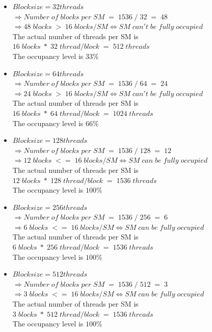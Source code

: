 \begin{itemize}
  \item $Block size = 32 threads$ \\ $\Rightarrow Number \; of \; blocks \; per \; SM \; = \; 1536 \; / \; 32 \; = \; 48$ \\ $\Rightarrow 48\;blocks\; > \; 16\;blocks/SM \Leftrightarrow SM \; can't \; be \; fully \; occupied$ \\ The actual number of threads per SM is $16\;blocks\;*\;32\;thread/block\;=\;512\;threads$ \\The occupancy level is $33\%$
  \item $Block size = 64 threads$ \\ $\Rightarrow Number \; of \; blocks \; per \; SM \; = \; 1536 \; / \; 64 \; = \; 24$ \\ $\Rightarrow 24\;blocks\; > \; 16\;blocks/SM \Leftrightarrow SM \; can't \; be \; fully \; occupied$ \\ The actual number of threads per SM is $16\;blocks\;*\;64\;thread/block\;=\;1024\;threads$ \\The occupancy level is $66\%$
  \item $Block size = 128 threads$ \\ $\Rightarrow Number \; of \; blocks \; per \; SM \; = \; 1536 \; / \; 128 \; = \; 12$ \\ $\Rightarrow 12\;blocks\; <= \; 16\;blocks/SM \Leftrightarrow SM \; can \; be \; fully \; occupied$ \\ The actual number of threads per SM is $12\;blocks\;*\;128\;thread/block\;=\;1536\;threads$ \\The occupancy level is $100\%$
  \item $Block size = 256 threads$ \\ $\Rightarrow Number \; of \; blocks \; per \; SM \; = \; 1536 \; / \; 256 \; = \; 6$ \\ $\Rightarrow 6\;blocks\; <= \; 16\;blocks/SM \Leftrightarrow SM \; can \; be \; fully \; occupied$ \\ The actual number of threads per SM is $6\;blocks\;*\;256\;thread/block\;=\;1536\;threads$ \\The occupancy level is $100\%$
  \item $Block size = 512 threads$ \\ $\Rightarrow Number \; of \; blocks \; per \; SM \; = \; 1536 \; / \; 512 \; = \; 3$ \\ $\Rightarrow 3\;blocks\; <= \; 16\;blocks/SM \Leftrightarrow SM \; can \; be \; fully \; occupied$ \\ The actual number of threads per SM is $3\;blocks\;*\;512\;thread/block\;=\;1536\;threads$ \\The occupancy level is $100\%$

\end{itemize}
